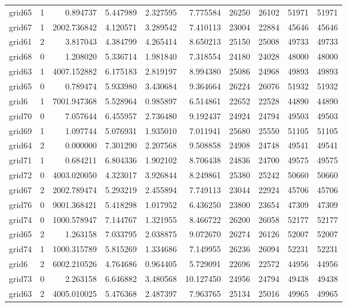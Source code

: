 \begin{longtable}{|l|r|r|r|r|r|r|r|r|r|}
grid65 & 1 & 0.894737 & 5.447989 & 2.327595 & 7.775584 & 26250 & 26102 & 51971 & 51971 \\
grid67 & 1 & 2002.736842 & 4.120571 & 3.289542 & 7.410113 & 23004 & 22884 & 45646 & 45646 \\
grid61 & 2 & 3.817043 & 4.384799 & 4.265414 & 8.650213 & 25150 & 25008 & 49733 & 49733 \\
grid68 & 0 & 1.208020 & 5.336714 & 1.981840 & 7.318554 & 24180 & 24028 & 48000 & 48000 \\
grid63 & 1 & 4007.152882 & 6.175183 & 2.819197 & 8.994380 & 25086 & 24968 & 49893 & 49893 \\
grid65 & 0 & 0.789474 & 5.933980 & 3.430684 & 9.364664 & 26224 & 26076 & 51932 & 51932 \\
grid6 & 1 & 7001.947368 & 5.528964 & 0.985897 & 6.514861 & 22652 & 22528 & 44890 & 44890 \\
grid70 & 0 & 7.057644 & 6.455957 & 2.736480 & 9.192437 & 24924 & 24794 & 49503 & 49503 \\
grid69 & 1 & 1.097744 & 5.076931 & 1.935010 & 7.011941 & 25680 & 25550 & 51105 & 51105 \\
grid64 & 2 & 0.000000 & 7.301290 & 2.207568 & 9.508858 & 24908 & 24748 & 49541 & 49541 \\
grid71 & 1 & 0.684211 & 6.804336 & 1.902102 & 8.706438 & 24836 & 24700 & 49575 & 49575 \\
grid72 & 0 & 4003.020050 & 4.323017 & 3.926844 & 8.249861 & 25380 & 25242 & 50660 & 50660 \\
grid67 & 2 & 2002.789474 & 5.293219 & 2.455894 & 7.749113 & 23044 & 22924 & 45706 & 45706 \\
grid76 & 0 & 9001.368421 & 5.418298 & 1.017952 & 6.436250 & 23800 & 23654 & 47309 & 47309 \\
grid74 & 0 & 1000.578947 & 7.144767 & 1.321955 & 8.466722 & 26200 & 26058 & 52177 & 52177 \\
grid65 & 2 & 1.263158 & 7.033795 & 2.038875 & 9.072670 & 26274 & 26126 & 52007 & 52007 \\
grid74 & 1 & 1000.315789 & 5.815269 & 1.334686 & 7.149955 & 26236 & 26094 & 52231 & 52231 \\
grid6 & 2 & 6002.210526 & 4.764686 & 0.964405 & 5.729091 & 22696 & 22572 & 44956 & 44956 \\
grid73 & 0 & 2.263158 & 6.646882 & 3.480568 & 10.127450 & 24956 & 24794 & 49438 & 49438 \\
grid63 & 2 & 4005.010025 & 5.476368 & 2.487397 & 7.963765 & 25134 & 25016 & 49965 & 49965 \\

\end{longtable}
